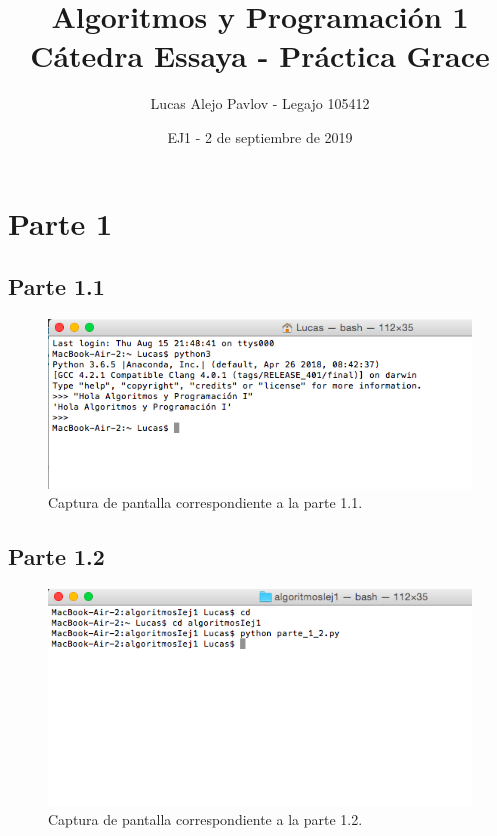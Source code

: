 \documentclass{article}
\title{Algoritmos y Programaci\'on 1\\
C\'atedra Essaya - Pr\'actica Grace}
\author{Lucas Alejo Pavlov - Legajo 105412}
\date{EJ1 - 2 de septiembre de 2019}
\begin{document}
\maketitle

\section*{Parte 1}
\subsection*{Parte 1.1}

\begin{figure}[H]
    \centering
    \includegraphics[width=1\textwidth]{parte1-1-cropped.png}
    \caption{Captura de pantalla correspondiente a la parte 1.1.}
    \label{fig:captura-1-1}
\end{figure}

\subsection*{Parte 1.2}
\begin{figure}[H]
    \centering
    \includegraphics[width=1\textwidth]{parte1-2.png}
    \caption{Captura de pantalla correspondiente a la parte 1.2.}
    \label{fig:captura-1-2}
\end{figure}
\end{document}
